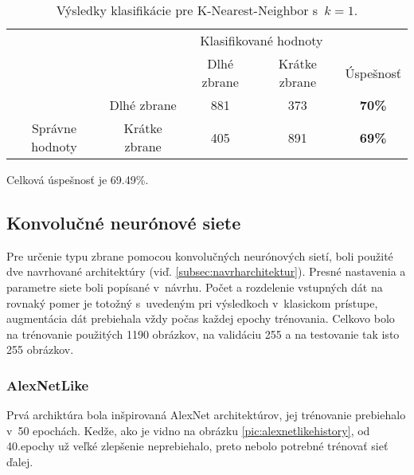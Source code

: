 \begin{table}[H]
    \centering
    \begin{tabular}{ccccc}
                                                                &                                    & \multicolumn{2}{c}{Klasifikované hodnoty}                                                         &                                    \\ \cline{3-5} 
                                                                & \multicolumn{1}{c|}{}              & \multicolumn{1}{c|}{Dlhé zbrane}                & \multicolumn{1}{c|}{Krátke zbrane}              & \multicolumn{1}{c|}{Úspešnosť}     \\ \cline{2-5} 
        \multicolumn{1}{c|}{}                                  & \multicolumn{1}{c|}{Dlhé zbrane}   & \multicolumn{1}{c|}{{\color[HTML]{009901} 881}} & \multicolumn{1}{c|}{{\color[HTML]{9A0000} 373}} & \multicolumn{1}{c|}{\textbf{70\%}} \\ \cline{2-5} 
        \multicolumn{1}{c|}{\multirow{-2}{*}{Správne hodnoty}} & \multicolumn{1}{c|}{Krátke zbrane} & \multicolumn{1}{c|}{{\color[HTML]{9A0000} 405}} & \multicolumn{1}{c|}{{\color[HTML]{009901} 891}} & \multicolumn{1}{c|}{\textbf{69\%}} \\ \cline{2-5} 
    \end{tabular}
    \caption{Výsledky klasifikácie pre K-Nearest-Neighbor s~$k=1$.}
    \label{tab:kmeans1}
\end{table}
Celková úspešnosť je 69.49\%.


\subsection{Konvolučné neurónové siete}
Pre určenie typu zbrane pomocou konvolučných neurónových sietí, boli použité dve navrhované architektúry (viď. \ref{subsec:navrharchitektur}).
Presné nastavenia a parametre siete boli popísané v~návrhu.
Počet a rozdelenie vstupných dát na rovnaký pomer je totožný s~uvedeným pri výsledkoch v~klasickom prístupe, augmentácia dát
    prebiehala vždy počas každej epochy trénovania.
Celkovo bolo na trénovanie použitých 1190 obrázkov, na validáciu 255 a na testovanie tak isto 255 obrázkov.

\subsubsection{AlexNetLike}
Prvá archiktúra bola inšpirovaná AlexNet architektúrov, jej trénovanie prebiehalo v~50 epochách.
Kedže, ako je vidno na obrázku \ref{pic:alexnetlikehistory}, od 40.epochy už veľké zlepšenie neprebiehalo, preto nebolo potrebné trénovať sieť ďalej.

